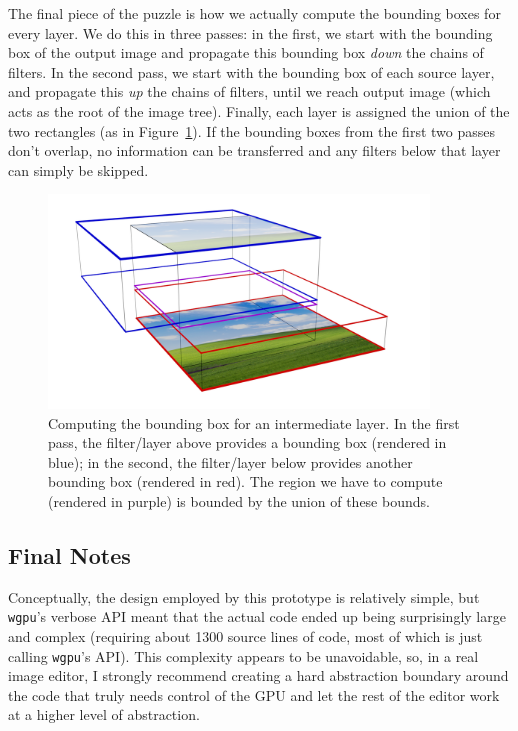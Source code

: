 \documentclass[12pt]{article}
\begin{document}
The final piece of the puzzle is how we actually compute the bounding boxes for every layer.  We do
this in three passes: in the first, we start with the bounding box of the output image and propagate
this bounding box \emph{down} the chains of filters.  In the second pass, we start with the bounding box of
each source layer, and propagate this \emph{up} the chains of filters, until we reach output image
(which acts as the root of the image tree).  Finally, each layer is assigned the union of the two
rectangles (as in Figure~\ref{fig:bbox-compute}).  If the bounding boxes from the first two passes
don't overlap, no information can be transferred and any filters below that layer can
simply be skipped.

\begin{figure}
    \begin{center}
        \includegraphics[width=0.9\textwidth]{bbox-compute}
    \end{center}
    \caption{Computing the bounding box for an intermediate layer.  In the first pass, the
    filter/layer above provides a bounding box (rendered in {\color{blue} blue}); in the second, the
    filter/layer below provides another bounding box (rendered in {\color{red} red}).  The region we
    have to compute (rendered in {\color{violet} purple}) is bounded by the union of these
    bounds.}\label{fig:bbox-compute}
\end{figure}

\subsection{Final Notes}

Conceptually, the design employed by this prototype is relatively simple, but \verb|wgpu|'s verbose
API meant that the actual code ended up being surprisingly large and complex (requiring about 1300
source lines of code, most of which is just calling \verb|wgpu|'s API).  This complexity appears to
be unavoidable, so, in a real image editor, I strongly recommend creating a hard abstraction boundary
around the code that truly needs control of the GPU and let the rest of the editor work at a higher
level of abstraction.
\end{document}
